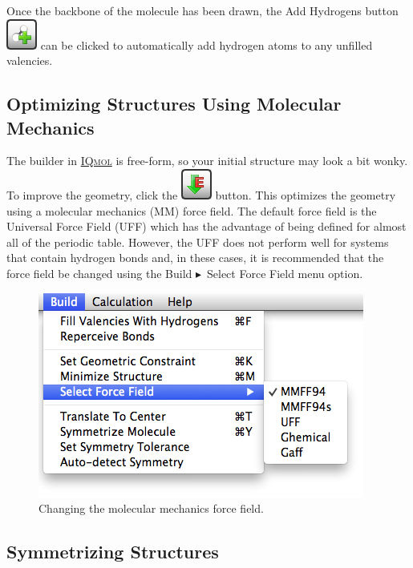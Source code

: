 \documentclass[a4paper,12pt]{article}
\newcommand{\iqmol}{\href{https://www.iqmol.org}{{\scshape IQmol}}}
\newcommand{\bt}{\ensuremath{\blacktriangleright}}
\begin{document}
Once the backbone of the molecule has been drawn, the Add Hydrogens button
\includegraphics[scale=0.40]{figures/AddHydrogensButton.png} can be clicked to
automatically add hydrogen atoms to any unfilled valencies.



\subsection{Optimizing Structures Using Molecular Mechanics}

The builder in \iqmol{} is free-form, so your initial structure may look a bit
wonky.  To improve the geometry, click the
\includegraphics[scale=0.40]{figures/MinimizeEnergyButton.png} button.  This
optimizes the geometry using a molecular mechanics (MM) force field.   The
default force field is the Universal Force Field (UFF)\cite{UFF} which has the
advantage of being defined for almost all of the periodic table.  However, the
UFF does not perform well for systems that contain hydrogen bonds and, in these
cases, it is recommended that the force field be changed using the Build \bt\
Select Force Field menu option.

\begin{figure}[h]
\begin{center}
\includegraphics[scale=0.5]{figures/ForceFieldMenu.png}
\caption{Changing the molecular mechanics force field.}
\end{center}
\end{figure}


\subsection{Symmetrizing Structures}
\end{document}
